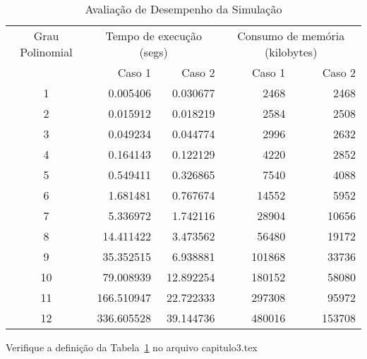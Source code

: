 \begin{table}[tbp]
\caption{Avaliação de Desempenho da Simulação}
\begin{center}
\begin{tabular}{c|| r|r || r|r}
\toprule
\cmidrule(r){1-5}
Grau Polinomial & \multicolumn{2}{c}{Tempo de execução (segs)} &
\multicolumn{2}{||c}{Consumo de memória (kilobytes)} \\
\cmidrule(r){2-5}
& Caso 1 & Caso 2 & Caso 1 & Caso 2 \\ 
\hline
\midrule
1  &   0.005406 &  0.030677 &   2468 &   2468 \\
2  &   0.015912 &  0.018219 &   2584 &   2508 \\
3  &   0.049234 &  0.044774 &   2996 &   2632 \\
4  &   0.164143 &  0.122129 &   4220 &   2852 \\
5  &   0.549411 &  0.326865 &   7540 &   4088 \\
6  &   1.681481 &  0.767674 &  14552 &   5952 \\
7  &   5.336972 &  1.742116 &  28904 &  10656 \\
8  &  14.411422 &  3.473562 &  56480 &  19172 \\
9  &  35.352515 &  6.938881 & 101868 &  33736 \\
10 &  79.008939 & 12.892254 & 180152 &  58080 \\
11 & 166.510947 & 22.722333 & 297308 &  95972 \\
12 & 336.605528 & 39.144736 & 480016 & 153708 \\
\bottomrule
\end{tabular}
\end{center}
\label{tab:avaliacao-desempenho}
\end{table}

Verifique a definição da Tabela~\ref{tab:avaliacao-desempenho} no arquivo capitulo3.tex

